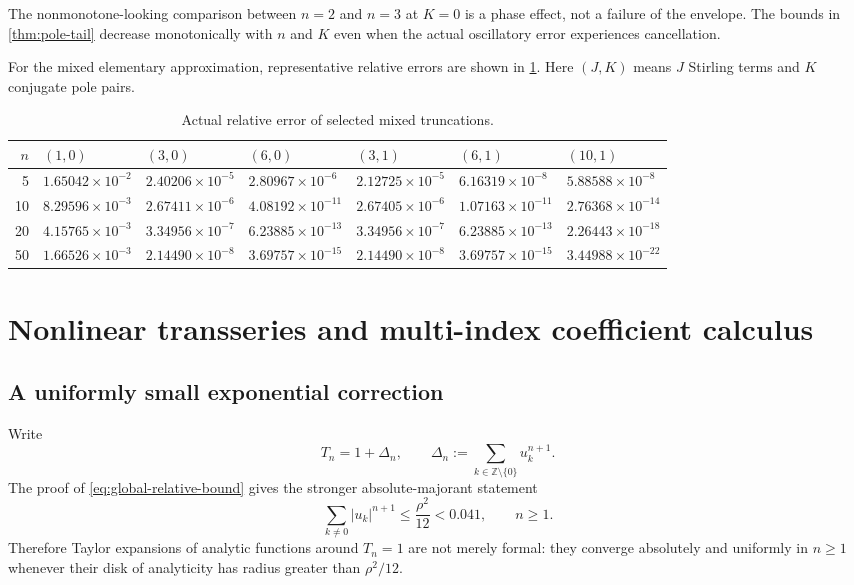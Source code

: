 \documentclass[11pt,a4paper,oneside]{article}
\theoremstyle{definition}
\theoremstyle{remark}
\begin{document}
The nonmonotone-looking comparison between $n=2$ and $n=3$ at $K=0$ is a
phase effect, not a failure of the envelope.  The bounds in
\cref{thm:pole-tail} decrease monotonically with $n$ and $K$ even when the
actual oscillatory error experiences cancellation.

For the mixed elementary approximation, representative relative errors are
shown in \cref{tab:mixed-errors}.  Here $(J,K)$ means $J$ Stirling terms and
$K$ conjugate pole pairs.

\begin{table}[htbp]
\centering
\caption{Actual relative error of selected mixed truncations.}
\label{tab:mixed-errors}
\begingroup
\scriptsize
\setlength{\tabcolsep}{3pt}
\begin{tabular}{@{}rllllll@{}}
\toprule
$n$ & $(1,0)$ & $(3,0)$ & $(6,0)$ & $(3,1)$ & $(6,1)$ & $(10,1)$\\
\midrule
5  & $1.65042\times 10^{-2}$ & $2.40206\times 10^{-5}$ & $2.80967\times 10^{-6}$ & $2.12725\times 10^{-5}$ & $6.16319\times 10^{-8}$ & $5.88588\times 10^{-8}$\\
10 & $8.29596\times 10^{-3}$ & $2.67411\times 10^{-6}$ & $4.08192\times 10^{-11}$& $2.67405\times 10^{-6}$ & $1.07163\times 10^{-11}$& $2.76368\times 10^{-14}$\\
20 & $4.15765\times 10^{-3}$ & $3.34956\times 10^{-7}$ & $6.23885\times 10^{-13}$& $3.34956\times 10^{-7}$ & $6.23885\times 10^{-13}$& $2.26443\times 10^{-18}$\\
50 & $1.66526\times 10^{-3}$ & $2.14490\times 10^{-8}$ & $3.69757\times 10^{-15}$& $2.14490\times 10^{-8}$ & $3.69757\times 10^{-15}$& $3.44988\times 10^{-22}$\\
\bottomrule
\end{tabular}
\endgroup
\end{table}


\section{Nonlinear transseries and multi-index coefficient calculus}
\label{sec:nonlinear}

\subsection{A uniformly small exponential correction}
Write
\begin{equation}\label{eq:Delta-def}
 T_n=1+\Delta_n,
 \qquad
 \Delta_n:=\sum_{k\in\mathbb Z\setminus\{0\}}u_k^{n+1}.
\end{equation}
The proof of \cref{eq:global-relative-bound} gives the stronger absolute-majorant
statement
\begin{equation}\label{eq:Delta-majorant}
 \sum_{k\ne0}|u_k|^{n+1}
 \le\frac{\rho^2}{12}<0.041,
 \qquad n\ge1.
\end{equation}
Therefore Taylor expansions of analytic functions around $T_n=1$ are not
merely formal: they converge absolutely and uniformly in $n\ge1$ whenever
their disk of analyticity has radius greater than $\rho^2/12$.
\end{document}
